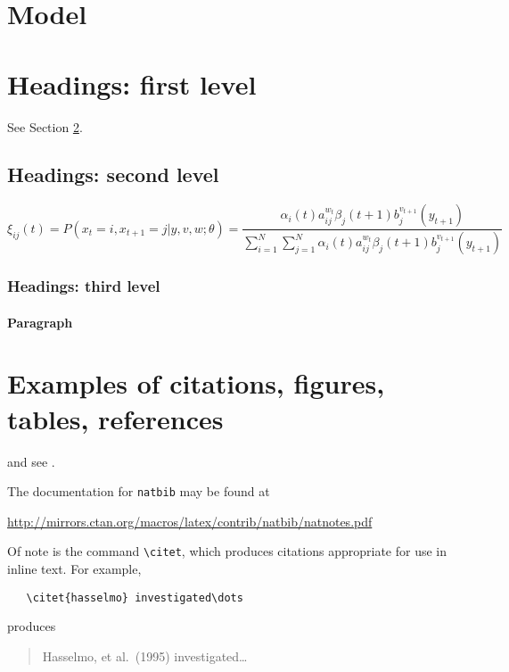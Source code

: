 \documentclass{article}
\begin{document}
\section{Model}

\section{Headings: first level}
\label{sec:headings}

\lipsum[4] See Section \ref{sec:headings}.

\subsection{Headings: second level}
\lipsum[5]
\begin{equation}
\xi _{ij}(t)=P(x_{t}=i,x_{t+1}=j|y,v,w;\theta)= {\frac {\alpha _{i}(t)a^{w_t}_{ij}\beta _{j}(t+1)b^{v_{t+1}}_{j}(y_{t+1})}{\sum _{i=1}^{N} \sum _{j=1}^{N} \alpha _{i}(t)a^{w_t}_{ij}\beta _{j}(t+1)b^{v_{t+1}}_{j}(y_{t+1})}}
\end{equation}

\subsubsection{Headings: third level}
\lipsum[6]

\paragraph{Paragraph}
\lipsum[7]

\section{Examples of citations, figures, tables, references}
\label{sec:others}
\lipsum[8] \cite{kour2014real,kour2014fast} and see \cite{hadash2018estimate}.

The documentation for \verb+natbib+ may be found at
\begin{center}
  \url{http://mirrors.ctan.org/macros/latex/contrib/natbib/natnotes.pdf}
\end{center}
Of note is the command \verb+\citet+, which produces citations
appropriate for use in inline text.  For example,
\begin{verbatim}
   \citet{hasselmo} investigated\dots
\end{verbatim}
produces
\begin{quote}
  Hasselmo, et al.\ (1995) investigated\dots
\end{quote}
\end{document}
